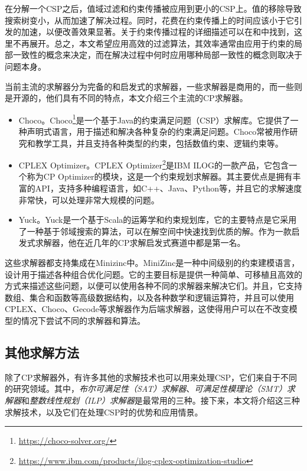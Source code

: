 在分解一个CSP之后，值域过滤和约束传播被应用到更小的CSP上。值的移除导致搜索树变小，从而加速了解决过程。同时，花费在约束传播上的时间应该小于它引发的加速，以便改善效果显著。关于约束传播过程的详细描述可以在\cite{apt1999essence}和\cite{apt2003principles}中找到，这里不再展开。总之，本文希望应用高效的过滤算法，其效率通常由应用于约束的局部一致性的概念来决定，而在解决过程中何时应用哪种局部一致性的概念则取决于问题本身。

当前主流的求解器分为完备的和启发式的求解器，一些求解器是商用的，而一些则是开源的，他们具有不同的特点，本文介绍三个主流的CP求解器。

\begin{itemize}
    \item Choco。Choco\footnote{\href{https://choco-solver.org/}{https://choco-solver.org/}}是一个基于Java的约束满足问题（CSP）求解库。它提供了一种声明式语言，用于描述和解决各种复杂的约束满足问题。Choco常被用作研究和教学工具，并且支持各种类型的约束，包括数值约束、逻辑约束等。
    \item CPLEX Optimizer。CPLEX Optimizer\footnote{\href{https://www.ibm.com/products/ilog-cplex-optimization-studio}{https://www.ibm.com/products/ilog-cplex-optimization-studio}}是IBM ILOG的一款产品，它包含一个称为CP Optimizer的模块，这是一个约束规划求解器。其主要优点是拥有丰富的API，支持多种编程语言，如C++、Java、Python等，并且它的求解速度非常快，可以处理非常大规模的问题。
    \item Yuck。Yuck是一个基于Scala的运筹学和约束规划库，它的主要特点是它采用了一种基于邻域搜索的算法，可以在解空间中快速找到优质的解。作为一款启发式求解器，他在近几年的CP求解启发式赛道中都是第一名。
\end{itemize}

这些求解器都支持集成在Minizinc\cite{nethercote2007minizinc}中。MiniZinc是一种中间级别的约束建模语言，设计用于描述各种组合优化问题。它的主要目标是提供一种简单、可移植且高效的方式来描述这些问题，以便可以使用各种不同的求解器来解决它们。并且，它支持数组、集合和函数等高级数据结构，以及各种数学和逻辑运算符，并且可以使用CPLEX、Choco、Gecode等求解器作为后端求解器，这使得用户可以在不改变模型的情况下尝试不同的求解器和算法。

\subsection{其他求解方法}

除了CP求解器外，有许多其他的求解技术也可以用来处理CSP，它们来自于不同的研究领域。其中，\textit{布尔可满足性（SAT）求解器}、\textit{可满足性模理论（SMT）求解器}和\textit{整数线性规划（ILP）求解器}是最常用的三种。接下来，本文将介绍这三种求解技术，以及它们在处理CSP时的优势和应用情景。


